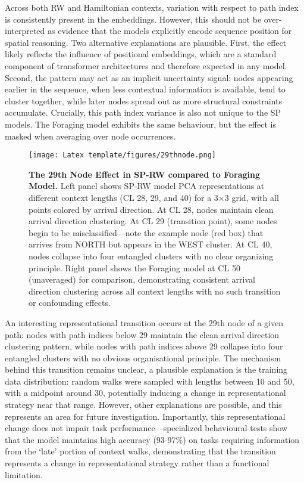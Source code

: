 Across both RW and Hamiltonian contexts, variation with respect to path index is consistently present in the embeddings. However, this should not be over-interpreted as evidence that the models explicitly encode sequence position for spatial reasoning. Two alternative explanations are plausible. First, the effect likely reflects the influence of positional embeddings, which are a standard component of transformer architectures and therefore expected in any model. Second, the pattern may act as an implicit uncertainty signal: nodes appearing earlier in the sequence, when less contextual information is available, tend to cluster together, while later nodes spread out as more structural constraints accumulate. Crucially, this path index variance is also not unique to the SP models. The Foraging model exhibits the same behaviour, but the effect is masked when averaging over node occurrences.
\begin{figure}[h]
\centering
\texttt{[image: Latex template/figures/29thnode.png]}
\caption[The 29th Node Effect in SP-RW compared to Foraging Model.]{\textbf{The 29th Node Effect in SP-RW compared to Foraging Model.} Left panel shows SP-RW model PCA representations at different context lengths (CL 28, 29, and 40) for a 3×3 grid, with all points colored by arrival direction. At CL 28, nodes maintain clean arrival direction clustering. At CL 29 (transition point), some nodes begin to be misclassified—note the example node (red box) that arrives from NORTH but appears in the WEST cluster. At CL 40, nodes collapse into four entangled clusters with no clear organizing principle. Right panel shows the Foraging model at CL 50 (unaveraged) for comparison, demonstrating consistent arrival direction clustering across all context lengths with no such transition or confounding effects.}
\label{fig:29th_node_effect}
\end{figure}
An interesting representational transition occurs at the 29th node of a given path: nodes with path indices below 29 maintain the clean arrival direction clustering pattern, while nodes with path indices above 29 collapse into four entangled clusters with no obvious organisational principle. The mechanism behind this transition remains unclear, a plausible explanation is the training data distribution: random walks were sampled with lengths between 10 and 50, with a midpoint around 30, potentially inducing a change in representational strategy near that range. However, other explanations are possible, and this represents an area for future investigation. Importantly, this representational change does not impair task performance—specialized behavioural tests show that the model maintains high accuracy (93-97\%) on tasks requiring information from the `late' portion of context walks, demonstrating that the transition represents a change in representational strategy rather than a functional limitation.

